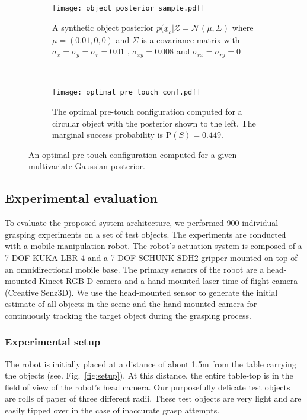 \begin{figure}
    \centering
    \begin{subfigure}[b]{0.45\textwidth}
        \texttt{[image: object\_posterior\_sample.pdf]}
        \caption{A synthetic object posterior $p(\underline{x}_o|\mathcal{Z} = \mathcal{N}(\mu, \Sigma)$ where $\mu = \left( 0.01,0,0  \right) $ and $\Sigma$ is a covariance matrix with $\sigma_x = \sigma_y = \sigma_r = 0.01$ , $\sigma_{xy} = 0.008$ and $\sigma_{rx} = \sigma_{ry} = 0$ }
        \label{fig:object_posterior_sample}
    \end{subfigure}
    ~ %
    \begin{subfigure}[b]{0.45\textwidth}
        \texttt{[image: optimal\_pre\_touch\_conf.pdf]}
        \caption{The optimal pre-touch configuration computed for a circular object with the posterior shown to the left. The marginal success probability is $\text{P}(S) = 0.449$.}
        \label{fig:optimal_pre_touch_conf}
    \end{subfigure}
    \caption{An optimal pre-touch configuration computed for a given multivariate Gaussian posterior.}\label{fig:2dexample}
\end{figure}


\subsection{Experimental evaluation}
To evaluate the proposed system architecture, we performed 900 individual grasping experiments on a set of test objects. The experiments are conducted with a mobile manipulation robot. The robot's actuation system is composed of a 7 DOF KUKA LBR 4 and a 7 DOF SCHUNK SDH2 gripper mounted on top of an omnidirectional mobile base. The primary sensors of the robot are a head-mounted Kinect RGB-D camera and a hand-mounted laser time-of-flight camera (Creative Senz3D). We use the head-mounted sensor to generate the initial estimate of all objects in the scene and the hand-mounted camera for continuously tracking the target object during the grasping process.

\subsubsection{Experimental setup}
The robot is initially placed at a distance of about 1.5m from the table carrying the objects (see. Fig.~\ref{fig:setup}). At this distance, the entire table-top is in the field of view of the robot's head camera. Our purposefully delicate test objects are rolls of paper of three different radii. These test objects are very light and are easily tipped over in  the case of inaccurate grasp attempts.

